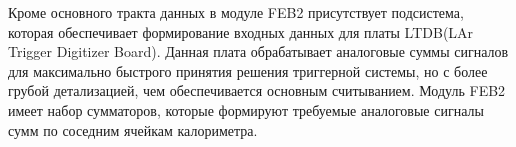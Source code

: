 Кроме основного тракта данных в модуле FEB2 присутствует подсистема, которая обеспечивает формирование входных данных для платы LTDB(LAr Trigger Digitizer Board). Данная плата обрабатывает аналоговые суммы сигналов для максимально быстрого принятия решения триггерной системы, но с более грубой детализацией, чем обеспечивается основным считыванием. Модуль FEB2 имеет набор сумматоров, которые формируют требуемые аналоговые сигналы сумм по соседним ячейкам калориметра.\par
